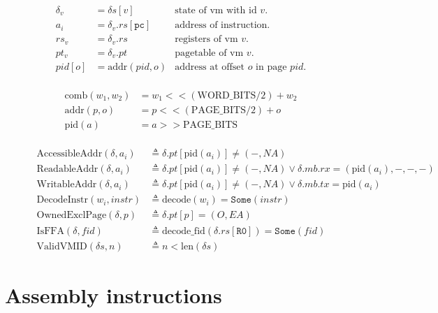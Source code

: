 \documentclass[a4paper]{article}
\let\Oldsection\section
\renewcommand{\section}{\FloatBarrier\Oldsection}
\newcommand*{\defined}{\triangleq}
\newcommand*{\PPBITS}{\text{PAGE\_BITS}}
\newcommand*{\PWBITS}{\text{WORD\_BITS}}
\newcommand*{\DN}[1]{\mathtt{Done} \; {#1}}
\newcommand*{\NXT}[1]{\mathtt{Next} \; {#1}}
\newcommand*{\decode}{\text{decode}}
\newcommand*{\pid}{\text{pid}}
\newcommand{\SOME}{\mathtt{Some}}
\begin{document}
\newcommand{\reg}[1]{\texttt{{#1}}}
\newcommand{\ta}[1]{\text{to\_addr}({#1})}
\newcommand{\tw}[1]{\text{to\_word}({#1})}
\newcommand{\tv}[1]{\text{to\_vmid}({#1})}
\newcommand{\DNNXT}[1]{\DN{\NXT{ {#1} }}}
\begin{figure}[!htb]
    \begin{align*}
      \delta_v&=\delta s[v] & \text{state of vm with id }v.\\
      a_i&=\delta_v.rs[\mathtt{pc}] & \text{address of instruction}. \\
      rs_v&=\delta_v.rs & \text{registers of vm }v.\\
      pt_{v}&=\delta_v.pt & \text{pagetable of vm }v.\\
      pid[o] &=\text{addr}(pid,o) & \text{address at offset }o \text{ in page }pid.
    \end{align*}
    \\
    \begin{align*}
          \text{comb}(w_{1},w_{2})&=w_{1}<<(\PWBITS/2)+w_{2}\\
    \text{addr}(p,o)&=p<<(\PPBITS/2)+o \\
    \pid(a) &= a >> \PPBITS
      \end{align*}
    \\
    \begin{align*}
      \text{AccessibleAddr}(\delta,a_i) &\defined \delta.pt[\pid(a_i)]\ne(-,NA) \\
      \text{ReadableAddr}(\delta,a_i) &\defined \delta.pt[\pid(a_i)]\ne(-,NA) \lor \delta.mb.rx=(\pid(a_i),-,-,-) \\
      \text{WritableAddr}(\delta,a_i) &\defined \delta.pt[\pid(a_i)]\ne(-,NA) \lor \delta.mb.tx=\pid(a_i) \\
      \text{DecodeInstr}(w_i,instr) &\defined \decode(w_i)=\SOME(instr)\\
      \text{OwnedExclPage}(\delta,p) & \defined \delta.pt[p]=(O,EA)\\
      \text{IsFFA}(\delta, fid) & \defined \text{decode\_fid}(\delta.rs[\reg{R0}])=\SOME(fid)\\
      \text{ValidVMID}(\delta s,n) &\defined n<\text{len}(\delta s)
      \end{align*}
  \end{figure}

\section{Assembly instructions}
\end{document}
